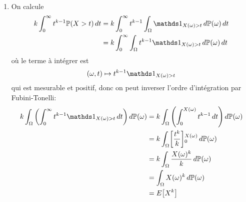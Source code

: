 {\begin{td-sol}[]
\begin{enumerate}
            \item On calcule
            \begin{equation*}
                \begin{aligned}
                    k\int_{0}^\infty t^{k-1}\bb P(X>t) \der t
                    &= k\int_{0}^\infty t^{k-1} \int_{\Omega} \one_{X(\omega)>t} \der\bb P(\omega) \der t\\
                    &= k\int_{0}^\infty \int_{\Omega}t^{k-1}  \one_{X(\omega)>t} \der\bb P(\omega) \der t\\
                \end{aligned}
            \end{equation*}
            où le terme à intégrer est
            \begin{equation*}
                (\omega,t)\mapsto t^{k-1}  \one_{X(\omega)>t}
            \end{equation*}
            qui est mesurable et positif, donc on peut inverser l'ordre
            d'intégration par Fubini-Tonelli:
            \begin{equation*}
                \begin{aligned}
                    k\int_{\Omega} \left( \int_{0}^\infty t^{k-1}  \one_{X(\omega)>t} \der t \right) \der\bb P(\omega)
                    &= k\int_{\Omega} \left( \int_{0}^{X(\omega)} t^{k-1} \der t \right) \der\bb P(\omega)\\
                    &= k\int_{\Omega} \ff{\frac{t^k}{k}}_0^{X(\omega)} \der\bb P(\omega)\\
                    &= k\int_{\Omega} \frac{X(\omega)^k}{k} \der\bb P(\omega)\\
                    &= \int_{\Omega} X(\omega)^k \der\bb P(\omega)\\
                    &= E\ff{X^k}
                \end{aligned}
            \end{equation*}


\end{enumerate}
\end{td-sol}}
